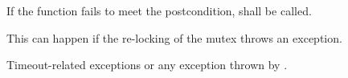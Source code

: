{\begin{itemdescr}
 \pnum \remarks
        If the function fails to meet the postcondition, 
        shall be called.
        \begin{note} This can happen if the re-locking of the mutex throws an exception. \end{note}
 
 \pnum \throws Timeout-related
        exceptions or any exception thrown by .

\end{itemdescr}


}%

